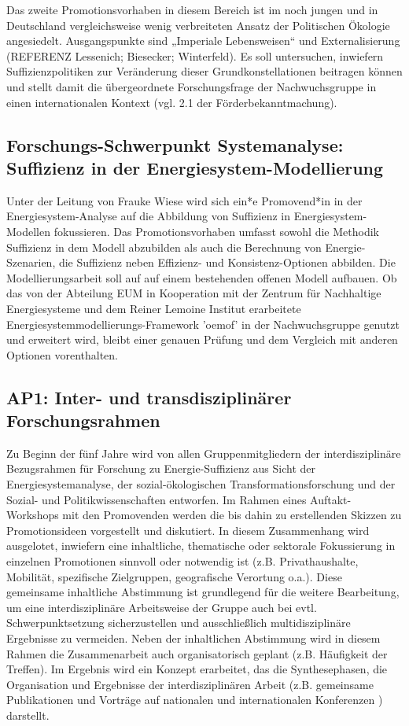 \documentclass[a4paper,11pt,twoside]{scrartcl}
\begin{document}
Das zweite Promotionsvorhaben in diesem Bereich ist im noch jungen und in Deutschland vergleichsweise wenig verbreiteten Ansatz der Politischen Ökologie angesiedelt. Ausgangspunkte sind „Imperiale Lebensweisen“ \cite{Brand2017}und Externalisierung (REFERENZ Lessenich; Biesecker; Winterfeld). Es soll untersuchen, inwiefern Suffizienzpolitiken zur Veränderung dieser Grundkonstellationen beitragen können und stellt damit die übergeordnete Forschungsfrage der Nachwuchsgruppe in einen internationalen Kontext (vgl. 2.1 der Förderbekanntmachung).

\subsection*{Forschungs-Schwerpunkt Systemanalyse: Suffizienz in der Energiesystem-Modellierung}

Unter der Leitung von Frauke Wiese wird sich ein*e Promovend*in in der Energiesystem-Analyse auf die Abbildung von Suffizienz in Energiesystem-Modellen fokussieren. Das Promotionsvorhaben umfasst sowohl die Methodik Suffizienz in dem Modell abzubilden als auch die Berechnung von Energie-Szenarien, die Suffizienz neben Effizienz- und Konsistenz-Optionen abbilden. Die Modellierungsarbeit soll auf auf einem bestehenden offenen Modell aufbauen. Ob das von der Abteilung EUM in Kooperation mit der Zentrum für Nachhaltige Energiesysteme und dem Reiner Lemoine Institut erarbeitete Energiesystemmodellierungs-Framework 'oemof' in der Nachwuchsgruppe genutzt und erweitert wird, bleibt einer genauen Prüfung und dem Vergleich mit anderen Optionen vorenthalten.

\subsection*{AP1: Inter- und transdisziplinärer Forschungsrahmen}

Zu Beginn der fünf Jahre wird von allen Gruppenmitgliedern der interdisziplinäre Bezugsrahmen für Forschung zu Energie-Suffizienz aus Sicht der Energiesystemanalyse, der sozial-ökologischen Transformationsforschung und der Sozial- und Politikwissenschaften entworfen. Im Rahmen eines Auftakt-Workshops mit den Promovenden werden die bis dahin zu erstellenden Skizzen zu Promotionsideen vorgestellt und diskutiert. In diesem Zusammenhang wird ausgelotet, inwiefern eine inhaltliche, thematische oder sektorale Fokussierung in einzelnen Promotionen sinnvoll oder notwendig ist (z.B. Privathaushalte, Mobilität, spezifische Zielgruppen, geografische Verortung o.a.). Diese gemeinsame inhaltliche Abstimmung ist grundlegend für die weitere Bearbeitung, um eine interdisziplinäre Arbeitsweise der Gruppe auch bei evtl. Schwerpunktsetzung sicherzustellen und ausschließlich multidisziplinäre Ergebnisse zu vermeiden. Neben der inhaltlichen Abstimmung wird in diesem Rahmen die Zusammenarbeit auch organisatorisch geplant (z.B. Häufigkeit der Treffen). Im Ergebnis wird ein Konzept erarbeitet, das die Synthesephasen, die Organisation und Ergebnisse der interdisziplinären Arbeit (z.B. gemeinsame Publikationen und Vorträge auf nationalen und internationalen Konferenzen ) darstellt.
\end{document}
